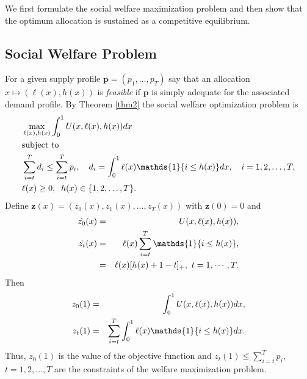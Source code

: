 \documentclass[10pt,draftcls,onecolumn]{IEEEtran}
\let \VEC \mathbf
\def\ind{{\mathds{1}}}
\newcounter{l1}
\newcounter{l2}
\newcounter{l3}
\begin{document}
We first formulate the  social welfare maximization problem and then show that the optimum  allocation is sustained as a competitive equilibrium. 


\subsection{Social Welfare Problem}

For a given supply profile $\VEC p = (p_1,\ldots,p_T)$ say that
an allocation  $x \mapsto (\ell(x),h(x))$ is \textit{feasible} if $\VEC p$ is simply adequate for the associated demand profile. By Theorem \ref{thm2} the social welfare optimization problem is
\begin{align}
    &\max_{\ell(x),h(x)} \int_0^1 U(x,\ell(x),h(x))dx \label{16}\\
    & \mbox{subject to} \notag \\
    &\sum_{i=t}^T d_i \leq \sum_{i=t}^T p_i, \quad 
    d_i = \int_0^1 \ell(x)\ind{\{i \leq h(x)\}}dx, \quad i=1,2,\ldots,T, \notag \\
    & \ell(x) \geq 0,\;\;h(x) \in \{1,2,\ldots,T\}. \notag
\end{align}
Define $\VEC z(x) = (z_0(x),z_1(x),\ldots,z_T(x))$ with $\VEC z(0)=0$ and 
\begin{eqnarray}
\dot{z_0}(x) &=& U(x,\ell(x),h(x)) , \label{eq:de_1}\\
\dot{z_t}(x)&=&\ell(x)\sum_{i=t}^T\ind{\{i \leq h(x)\}}, \notag\\
&=& \ell(x) [h(x)+1 -t]_+ , \ t=1, \cdots, T .\label{eq:de_2}
\end{eqnarray}
Then
\begin{eqnarray}
z_0(1) &=& \int_0^1 U(x,\ell(x),h(x))dx ,\notag \\
z_t(1) &=&  \sum_{i=t}^T \int_0^1 \ell(x)\ind{\{i \leq h(x)\}}dx.
\end{eqnarray}
Thus, $z_0(1)$ is the value of the objective function and  $z_t(1) \leq \sum_{i=t}^T p_i$, $t=1,2,\ldots,T$ are the constraints of the  welfare maximization problem.
 
\end{document}
